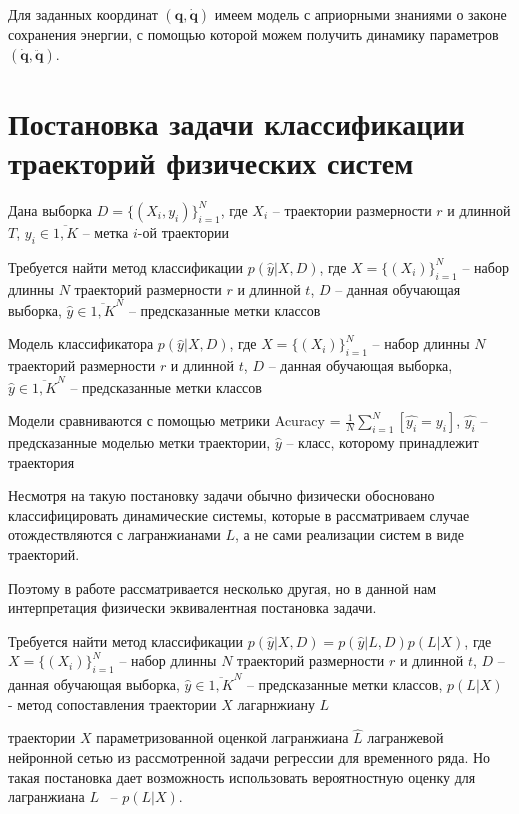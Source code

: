 \documentclass[12pt, twoside]{article}
\begin{document}
Для заданных координат $(\mathbf{q}, \mathbf{\dot{q}})$ имеем модель с априорными знаниями о законе сохранения энергии, с помощью которой можем получить динамику параметров $(\mathbf{\dot{q}}, \mathbf{\ddot{q}})$. 


\section{Постановка задачи классификации траекторий физических систем}\label{sec:classification}

Дана выборка
$D = \{(X_i, y_i)\}_{i=1}^N$, где $X_i$ -- траектории размерности $r$ и длинной $T$, $y_i \in \overline{1, K}$ -- метка $i$-ой траектории

Требуется найти метод классификации $p(\hat{y}|X, D)$, где $X = \{(X_i)\}_{i=1}^N$ -- набор длинны $N$ траекторий размерности $r$ и длинной $t$, $D$ -- данная обучающая выборка, $\hat{y} \in \overline{1, K}^N$ -- предсказанные метки классов

Модель классификатора $p(\hat{y}|X, D)$, где $X = \{(X_i)\}_{i=1}^N$ -- набор длинны $N$ траекторий размерности $r$ и длинной $t$, $D$ -- данная обучающая выборка, $\hat{y} \in \overline{1, K}^N$ -- предсказанные метки классов

Модели сравниваются с помощью метрики Acuracy = $\frac{1}{N} \sum_{i = 1}^N \left[\hat{y_i} = y_i\right]$, $\hat{y_i}$ -- предсказанные моделью метки траектории, $\hat{y}$ -- класс, которому принадлежит траектория

Несмотря на такую постановку задачи обычно физически обосновано классифицировать динамические системы, которые в рассматриваем случае отождествляются с лагранжианами $L$, а не сами реализации систем в виде траекторий. 

Поэтому в работе рассматривается несколько другая, но в данной нам интерпретация физически эквивалентная постановка задачи.

Требуется найти метод классификации $p(\hat{y}|X, D) = p(\hat{y}|L, D)p(L|X)$, где $X = \{(X_i)\}_{i=1}^N$ -- набор длинны $N$ траекторий размерности $r$ и длинной $t$, $D$ -- данная обучающая выборка, $\hat{y} \in \overline{1, K}^N$ -- предсказанные метки классов, $p(L|X)$ - метод сопоставления траектории $X$ лагарнжиану $L$

 траектории $X$ параметризованной оценкой лагранжиана $\hat{L}$  лагранжевой нейронной сетью из рассмотренной задачи регрессии для временного ряда. Но такая постановка дает возможность использовать вероятностную оценку для лагранжиана $L$ ~-- $p(L|X)$.
\end{document}
